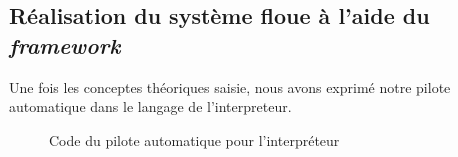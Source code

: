 \documentclass[a4paper,11pt]{article}
\begin{document}
    \subsection{Réalisation du système floue à l'aide du \textit{framework}}

    Une fois les conceptes théoriques saisie, nous avons exprimé notre pilote automatique dans le langage de l'interpreteur.

    \begin{figure}[H]
        \begin{center}
            \caption{Code du pilote automatique pour l’interpréteur}
            
            \label{fig:codeAutoPilot}
        \end{center}
    \end{figure}
\end{document}
